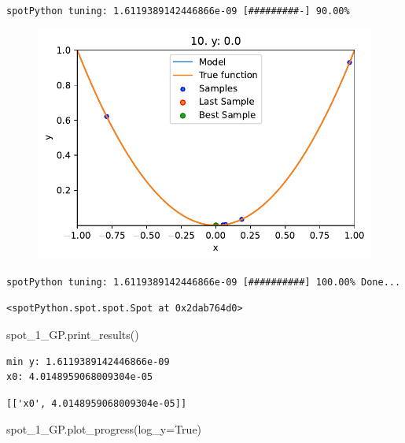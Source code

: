\documentclass[
  letterpaper,
  DIV=11,
  numbers=noendperiod]{scrreprt}
\newenvironment{Shaded}{\begin{snugshade}}{\end{snugshade}}
\newcommand{\NormalTok}[1]{\textcolor[rgb]{0.00,0.23,0.31}{#1}}
\newcommand{\OperatorTok}[1]{\textcolor[rgb]{0.37,0.37,0.37}{#1}}
\newcommand{\VariableTok}[1]{\textcolor[rgb]{0.07,0.07,0.07}{#1}}
\begin{document}
\begin{verbatim}
spotPython tuning: 1.6119389142446866e-09 [#########-] 90.00% 
\end{verbatim}

\begin{figure}[H]

{\centering \includegraphics{010_num_spot_sklearn_surrogate_files/figure-pdf/cell-25-output-14.pdf}

}

\end{figure}

\begin{verbatim}
spotPython tuning: 1.6119389142446866e-09 [##########] 100.00% Done...
\end{verbatim}

\begin{verbatim}
<spotPython.spot.spot.Spot at 0x2dab764d0>
\end{verbatim}

\begin{Shaded}
\begin{Highlighting}[]
\NormalTok{spot\_1\_GP.print\_results()}
\end{Highlighting}
\end{Shaded}

\begin{verbatim}
min y: 1.6119389142446866e-09
x0: 4.0148959068009304e-05
\end{verbatim}

\begin{verbatim}
[['x0', 4.0148959068009304e-05]]
\end{verbatim}

\begin{Shaded}
\begin{Highlighting}[]
\NormalTok{spot\_1\_GP.plot\_progress(log\_y}\OperatorTok{=}\VariableTok{True}\NormalTok{)}
\end{Highlighting}
\end{Shaded}
\end{document}
